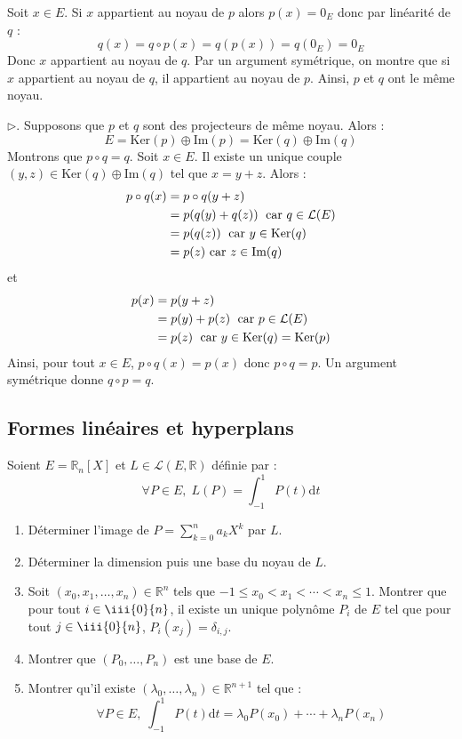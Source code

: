 \documentclass[a4paper,twoside,french,11pt]{VcCours}
\newcommand{\dt}{\text{d}t}
\begin{document}
\noindent Soit $x \in E$. Si $x$ appartient au noyau de $p$ alors $p(x) = 0_E$ donc par linéarité de $q$ :
$$ q(x)= q \circ p(x) = q(p(x))=q(0_E) = 0_E$$
Donc $x$ appartient au noyau de $q$. Par un argument symétrique, on montre que si $x$ appartient au noyau de $q$, il appartient au noyau de $p$. Ainsi, $p$ et $q$ ont le même noyau.



\noindent $\rhd$. Supposons que $p$ et $q$ sont des projecteurs de même noyau. Alors :
$$ E = \textrm{Ker}(p) \oplus \textrm{Im}(p) = \textrm{Ker}(q) \oplus \textrm{Im}(q)$$
Montrons que $p \circ q= q$. Soit $x \in E$. Il existe un unique couple $(y,z) \in \textrm{Ker}(q) \oplus \textrm{Im}(q)$ tel que $x=y+z$. Alors :
\begin{align*}
p \circ q(x) & = p\circ q (y+z) \\
& = p (q(y)+q(z))  \; \hbox{ car } q \in \mathcal{L}(E) \\
& = p (q(z))   \; \hbox{ car } y \in \textrm{Ker}(q) \\
& = p(z) \hbox{ car } z \in \textrm{Im}(q)
\end{align*}
et 
\begin{align*}
p(x) & = p(y+z) \\
& = p(y)+p(z) \; \hbox{ car } p \in \mathcal{L}(E) \\
& =  p(z) \; \hbox{ car } y \in \textrm{Ker}(q) = \textrm{Ker}(p)
\end{align*}
Ainsi, pour tout $x \in E$, $p \circ q(x)=p(x)$ donc $p \circ q = p$. Un argument symétrique donne $q \circ p = q$.







\subsection{\large Formes linéaires et hyperplans}



\begin{Exercice}{} Soient $E= \mathbb{R}_n[X]$ et $L \in \mathcal{L}(E, \mathbb{R})$ définie par :
$$ \forall P \in E, \;  L(P) = \int_{-1}^1 P(t) \dt$$
\begin{enumerate}
\item Déterminer l'image de $P= \sum_{k=0}^n a_k X^k$ par $L$.
\item Déterminer la dimension puis une base du noyau de $L$.
\item Soit $(x_0, x_1, \ldots, x_n) \in \mathbb{R}^n$ tels que $-1 \leq x_0 < x_1 < \cdots < x_n \leq 1$. Montrer que pour tout $i \in \iii{0}{n}$, il existe un unique polynôme $P_i$ de $E$ tel que pour tout $j \in \iii{0}{n}$, $P_i(x_j)= \delta_{i,j}$.
\item Montrer que $(P_0, \ldots, P_n)$ est une base de $E$.
\item Montrer qu'il existe $(\lambda_0, \ldots, \lambda_n) \in \mathbb{R}^{n+1}$ tel que :
$$ \forall P \in E, \; \int_{-1}^1 P(t) \dt = \lambda_0 P(x_0) + \cdots + \lambda_n P(x_n)$$
\end{enumerate}
\end{Exercice}
\end{document}
